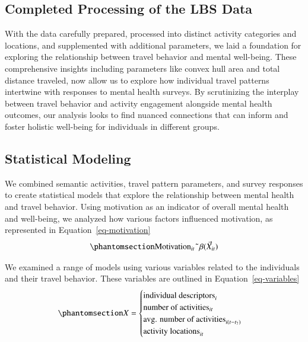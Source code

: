 \documentclass[
  letterpaper,
  number,
  review,
  3p]{elsarticle}
\begin{document}
\subsection{Completed Processing of the LBS
Data}\label{completed-processing-of-the-lbs-data}

With the data carefully prepared, processed into distinct activity
categories and locations, and supplemented with additional parameters,
we laid a foundation for exploring the relationship between travel
behavior and mental well-being. These comprehensive insights including
parameters like convex hull area and total distance traveled, now allow
us to explore how individual travel patterns intertwine with responses
to mental health surveys. By scrutinizing the interplay between travel
behavior and activity engagement alongside mental health outcomes, our
analysis looks to find nuanced connections that can inform and foster
holistic well-being for individuals in different groups.

\subsection{Statistical Modeling}\label{statistical-modeling}

We combined semantic activities, travel pattern parameters, and survey
responses to create statistical models that explore the relationship
between mental health and travel behavior. Using motivation as an
indicator of overall mental health and well-being, we analyzed how
various factors influenced motivation, as represented in
Equation~\ref{eq-motivation}
\begin{equation}\phantomsection\label{eq-motivation}{
\text{Motivation}_{it} \; \tilde{} \; \beta (\vec{X}_{it})
}\end{equation}

We examined a range of models using various variables related to the
individuals and their travel behavior. These variables are outlined in
Equation~\ref{eq-variables}
\begin{equation}\phantomsection\label{eq-variables}{
X = 
\begin{cases} 
\text{individual descriptors}_i \\
\text{number of activities}_{it} \\
\text{avg. number of activities}_{i(t-t_7)} \\
\text{activity locations}_{it} \\
\end{cases}
}\end{equation}
\end{document}
